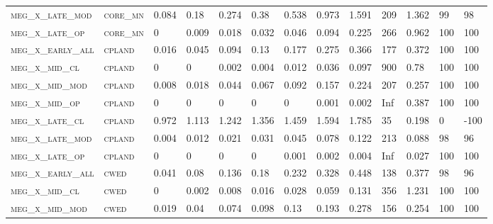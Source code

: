 \begin{landscape}
\begin{center}
\begin{footnotesize}
\begin{longtable}{lllllllllllll}
\textsc{meg\_x\_late\_mod } & \textsc{core\_mn  }   & 0.084    & 0.18     & 0.274    & 0.38     & 0.538    & 0.973    & 1.591     & 209    & 1.362         & 99            & 98            \\
\textsc{meg\_x\_late\_op  } & \textsc{core\_mn  }   & 0        & 0.009    & 0.018    & 0.032    & 0.046    & 0.094    & 0.225     & 266    & 0.962         & 100           & 100           \\
\textsc{meg\_x\_early\_all} & \textsc{cpland    }   & 0.016    & 0.045    & 0.094    & 0.13     & 0.177    & 0.275    & 0.366     & 177    & 0.372         & 100           & 100           \\
\textsc{meg\_x\_mid\_cl   } & \textsc{cpland    }   & 0        & 0        & 0.002    & 0.004    & 0.012    & 0.036    & 0.097     & 900    & 0.78          & 100           & 100           \\
\textsc{meg\_x\_mid\_mod  } & \textsc{cpland    }   & 0.008    & 0.018    & 0.044    & 0.067    & 0.092    & 0.157    & 0.224     & 207    & 0.257         & 100           & 100           \\
\textsc{meg\_x\_mid\_op   } & \textsc{cpland    }   & 0        & 0        & 0        & 0        & 0        & 0.001    & 0.002     & Inf    & 0.387         & 100           & 100           \\
\textsc{meg\_x\_late\_cl  } & \textsc{cpland    }   & 0.972    & 1.113    & 1.242    & 1.356    & 1.459    & 1.594    & 1.785     & 35     & 0.198         & 0             & -100          \\
\textsc{meg\_x\_late\_mod } & \textsc{cpland    }   & 0.004    & 0.012    & 0.021    & 0.031    & 0.045    & 0.078    & 0.122     & 213    & 0.088         & 98            & 96            \\
\textsc{meg\_x\_late\_op  } & \textsc{cpland    }   & 0        & 0        & 0        & 0        & 0.001    & 0.002    & 0.004     & Inf    & 0.027         & 100           & 100           \\
\textsc{meg\_x\_early\_all} & \textsc{cwed      }   & 0.041    & 0.08     & 0.136    & 0.18     & 0.232    & 0.328    & 0.448     & 138    & 0.377         & 98            & 96            \\
\textsc{meg\_x\_mid\_cl   } & \textsc{cwed      }   & 0        & 0.002    & 0.008    & 0.016    & 0.028    & 0.059    & 0.131     & 356    & 1.231         & 100           & 100           \\
\textsc{meg\_x\_mid\_mod  } & \textsc{cwed      }   & 0.019    & 0.04     & 0.074    & 0.098    & 0.13     & 0.193    & 0.278     & 156    & 0.254         & 100           & 100           \\

\end{longtable}
\end{footnotesize}
\end{center}
\end{landscape}
